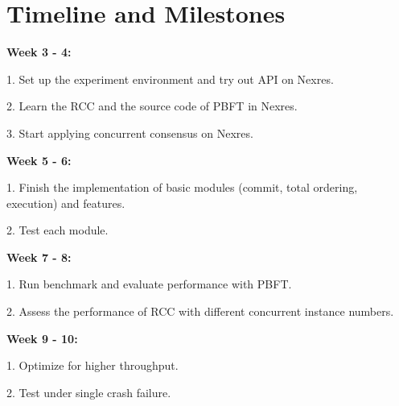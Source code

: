 \section{Timeline and Milestones}
\textbf{Week 3 - 4:}
\par 1. Set up the experiment environment and try out API on Nexres.
\par 2. Learn the RCC and the source code of PBFT in Nexres.
\par 3. Start applying concurrent consensus on Nexres. 

\noindent
\textbf{Week 5 - 6:}
\par 1. Finish the implementation of basic modules (commit, total ordering, execution) and features.
\par 2. Test each module.

\noindent
\textbf{Week 7 - 8:}
\par 1. Run benchmark and evaluate performance with PBFT.
\par 2. Assess the performance of RCC with different concurrent instance numbers.

\noindent
\textbf{Week 9 - 10:}
\par 1. Optimize for higher throughput.
\par 2. Test under single crash failure.